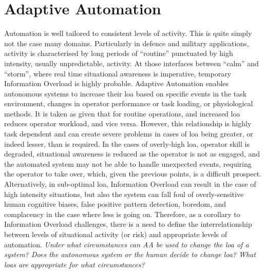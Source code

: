 \section{Adaptive Automation}
Automation is well tailored to consistent levels of activity.
This is quite simply not the case many domains.
Particularly in defence and military applications, activity is characterised by long periods of ``routine'' punctuated by high intensity, usually unpredictable, activity.
At those interfaces between ``calm'' and ``storm'', where real time situational awareness is imperative, temporary Information Overload is highly probable.
Adaptive Automation enables autonomous systems to increase their \gls{loa} based on specific events in the task environment, changes in operator performance or task loading, or physiological methods.
It is taken as given that for routine operations, and increased \gls{loa} reduces operator workload, and vice versa.
However, this relationship is highly task dependent and can create severe problems in cases of \gls{loa} being greater, or indeed lesser, than is required.
In the cases of overly-high \gls{loa}, operator skill is degraded, situational awareness is reduced as the operator is not as engaged, and the automated system may not be able to handle unexpected events, requiring the operator to take over, which, given the previous points, is a difficult prospect.
Alternatively, in sub-optimal \gls{loa}, Information Overload can result in the case of high intensity situations, but also the system can fall foul of overly-sensitive human cognitive biases, false positive pattern detection, boredom, and complacency in the case where less is going on.
Therefore, as a corollary to Information Overload challenges, there is a need to define the interrelationship between levels of situational activity (or risk) and appropriate levels of automation.
\textit{Under what circumstances can AA be used to change the \gls{loa} of a system?
Does the autonomous system or the human decide to change \gls{loa}\@? 
What \gls{loa}s are appropriate for what circumstances?}

